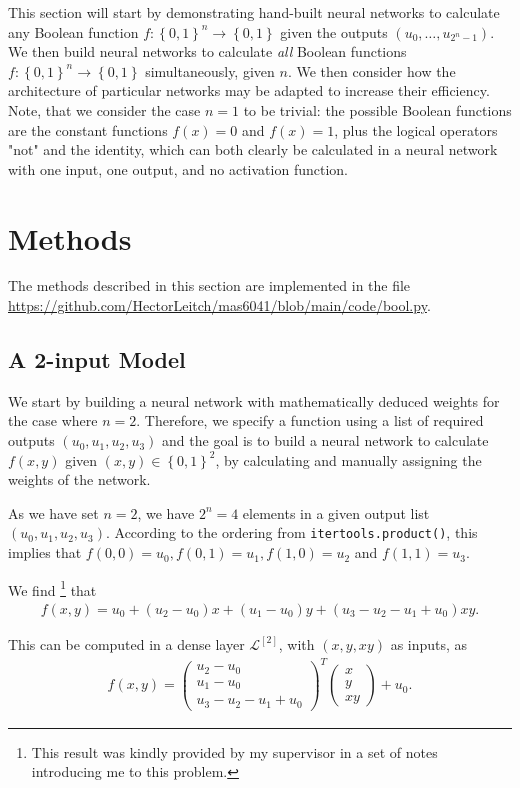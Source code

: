 \documentclass{somasmsc}
\begin{document}
This section will start by demonstrating hand-built neural networks to calculate any Boolean function $f:\left\{0, 1\right\}^n \rightarrow \left\{0, 1\right\}$ given the outputs $\left(u_0, \dots, u_{2^n-1}\right)$. We then build neural networks to calculate \textit{all} Boolean functions $f:\left\{0, 1\right\}^n \rightarrow \left\{0, 1\right\}$ simultaneously, given $n$. We then consider how the architecture of particular networks may be adapted to increase their efficiency. Note, that we consider the case $n=1$ to be trivial: the possible Boolean functions are the constant functions $f(x) = 0$ and $f(x) = 1$, plus the logical operators "not" and the identity, which can both clearly be calculated in a neural network with one input, one output, and no activation function.

\section{Methods}

The methods described in this section are implemented in the file \url{https://github.com/HectorLeitch/mas6041/blob/main/code/bool.py}.

\subsection{A 2-input Model}\label{bool:2d}

We start by building a neural network with mathematically deduced weights for the case where $n=2$. Therefore, we specify a function using a list of required outputs $\left(u_0, u_1, u_2, u_3\right)$ and the goal is to build a neural network to calculate $f(x, y)$ given $\left(x, y\right) \in \left\{0, 1\right\}^2$, by calculating and manually assigning the weights of the network.

As we have set $n=2$, we have $2^n = 4$ elements in a given output list $\left(u_0, u_1, u_2, u_3\right)$. According to the ordering from \verb|itertools.product()|, this implies that $f(0, 0) = u_0, f(0, 1) = u_1, f(1, 0) = u_2$ and $f(1, 1) = u_3$.

We find \footnote{This result was kindly provided by my supervisor in a set of notes introducing me to this problem.} that
\begin{align} \label{bool:eq1}
f(x, y) = u_0 + \left(u_2 - u_0\right)x + \left(u_1 - u_0\right)y + \left(u_3 - u_2 - u_1 + u_0\right)xy. 
\end{align}

This can be computed in a dense layer $\mathcal{L}^{\left[2\right]}$, with $\left(x, y, xy\right)$ as inputs, as
\begin{align} \label{bool:eq2}
f(x, y) =
\begin{pmatrix}
    u_2 - u_0 \\
    u_1 - u_0 \\
    u_3 - u_2 - u_1 + u_0
\end{pmatrix}^T
\begin{pmatrix}
    x \\
    y\\
    xy
\end{pmatrix}
+ u_0.
\end{align}
\end{document}

